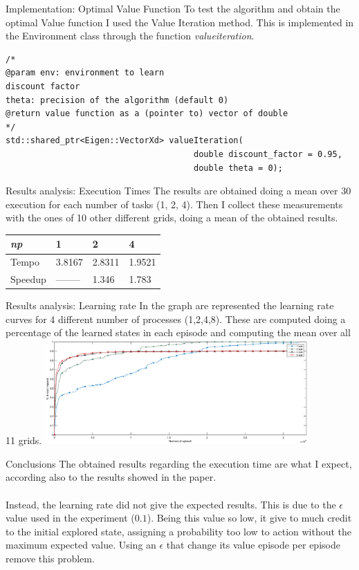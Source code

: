 \documentclass{beamer}
\begin{document}
\begin{frame}[fragile]{Implementation: Optimal Value Function}
To test the algorithm and obtain the optimal Value function I used the Value Iteration method. This is implemented in the Environment class through the function \emph{valueiteration}.
\begin{lstlisting}
/*
@param env: environment to learn
discount factor
theta: precision of the algorithm (default 0)
@return value function as a (pointer to) vector of double
*/
std::shared_ptr<Eigen::VectorXd> valueIteration(
                                      double discount_factor = 0.95,
                                      double theta = 0);
\end{lstlisting}
\end{frame}

\begin{frame}{Results analysis: Execution Times}
   The results are obtained doing a mean over 30 execution for each number of tasks (1, 2, 4). Then I collect these measurements with the ones of 10 other different grids, doing a mean of the obtained results.
\begin{table}
\centering
\begin{tabular}{| l | l | l | l |}
\hline
\emph{np} & 1 & 2 & 4\\
\hline
Tempo & 3.8167 & 2.8311 & 1.9521\\
\hline
Speedup & -------- & 1.346 & 1.783\\
\hline
\end{tabular}
\end{table}
\end{frame}

\begin{frame}{Results analysis: Learning rate}
In the graph are represented the learning rate curves for 4 different number of processes (1,2,4,8). These are computed doing a percentage of the learned states in each episode and computing the mean over all 11 grids.
\includegraphics[height=4cm]{per_learned_states}
\end{frame}

\begin{frame}{Conclusions}
The obtained results regarding the execution time are what I expect, according also to the results showed in the paper.
~\\~\\
Instead, the learning rate did not give the expected results. This is due to the $\epsilon$ value used in the experiment ($0.1$). Being this value so low, it give to much credit to the initial explored state, assigning a probability too low to action without the maximum expected value. Using an $\epsilon$ that change its value episode per episode remove this problem.
\end{frame}
\end{document}
